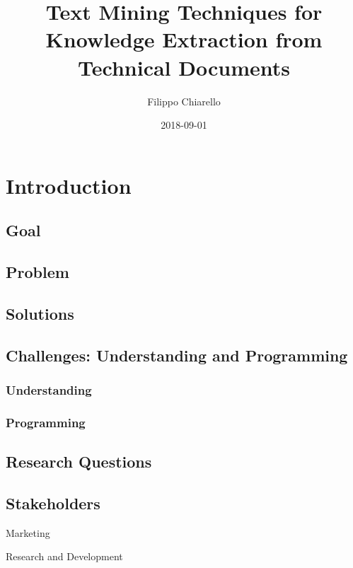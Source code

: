 \documentclass[]{book}
\title{Text Mining Techniques for Knowledge Extraction from Technical Documents}
\author{Filippo Chiarello}
\date{2018-09-01}
\theoremstyle{definition}
\theoremstyle{definition}
\theoremstyle{definition}
\theoremstyle{remark}
\begin{document}
\maketitle

{
\setcounter{tocdepth}{1}
\tableofcontents
}
\chapter{Introduction}\label{introduction}

\section{Goal}\label{goal}

\section{Problem}\label{problem}

\section{Solutions}\label{solutions}

\section{Challenges: Understanding and
Programming}\label{challenges-understanding-and-programming}

\subsection{Understanding}\label{understanding}

\subsection{Programming}\label{programming}

\section{Research Questions}\label{research-questions}

\section{Stakeholders}\label{stakeholders}

Marketing

Research and Development
\end{document}
